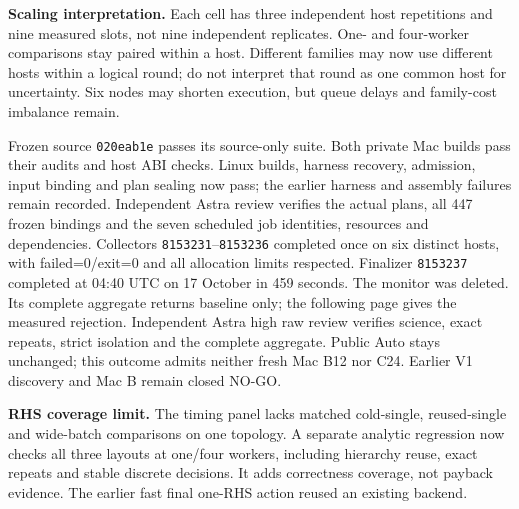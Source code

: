 \documentclass[11pt,letterpaper]{article}
\renewcommand{\arraystretch}{1.16}
\newcommand{\smallbody}{\fontsize{9.4}{11.65}\selectfont\color{Ink}\RaggedRight}
\newenvironment{compactleaf}{\setlength{\parskip}{2.5pt}\renewcommand{\arraystretch}{1.06}\renewcommand{\smallbody}{\fontsize{9.2}{11.1}\selectfont\color{Ink}\RaggedRight}\renewcommand{\sub}[1]{\par\vspace{2pt}{\sffamily\bfseries\fontsize{11.5}{14}\selectfont\color{Teal}##1\par}}\renewcommand{\tagline}[1]{{\sffamily\fontsize{9.5}{12}\selectfont\color{Muted}##1\par}\vspace{3pt}}}{}
\newcommand{\sub}[1]{\par\vspace{4pt}{\sffamily\bfseries\fontsize{11.5}{14}\selectfont\color{Teal}#1\par}\vspace{1pt}}
\newcommand{\tagline}[1]{{\sffamily\fontsize{9.5}{12}\selectfont\color{Muted}#1\par}\vspace{5pt}}
\newcommand{\code}[1]{\texttt{#1}}
\begin{document}
\begin{compactleaf}
\begin{note}\smallbody
\textbf{Scaling interpretation.} Each cell has three independent host repetitions and nine measured slots, not nine independent replicates. One- and four-worker comparisons stay paired within a host. Different families may now use different hosts within a logical round; do not interpret that round as one common host for uncertainty. Six nodes may shorten execution, but queue delays and family-cost imbalance remain.
\end{note}
\sub{Release boundary}
Frozen source \code{020eab1e} passes its source-only suite. Both private Mac builds pass their audits and host ABI checks. Linux builds, harness recovery, admission, input binding and plan sealing now pass; the earlier harness and assembly failures remain recorded. Independent Astra review verifies the actual plans, all 447 frozen bindings and the seven scheduled job identities, resources and dependencies. Collectors \code{8153231}--\code{8153236} completed once on six distinct hosts, with failed=0/exit=0 and all allocation limits respected. Finalizer \code{8153237} completed at 04:40 UTC on 17 October in 459 seconds. The monitor was deleted. Its complete aggregate returns baseline only; the following page gives the measured rejection. Independent Astra high raw review verifies science, exact repeats, strict isolation and the complete aggregate. Public Auto stays unchanged; this outcome admits neither fresh Mac B12 nor C24. Earlier V1 discovery and Mac B remain closed NO-GO.

\textbf{RHS coverage limit.} The timing panel lacks matched cold-single, reused-single and wide-batch comparisons on one topology. A separate analytic regression now checks all three layouts at one/four workers, including hierarchy reuse, exact repeats and stable discrete decisions. It adds correctness coverage, not payback evidence. The earlier fast final one-RHS action reused an existing backend.
\clearpage
\end{compactleaf}
\end{document}
